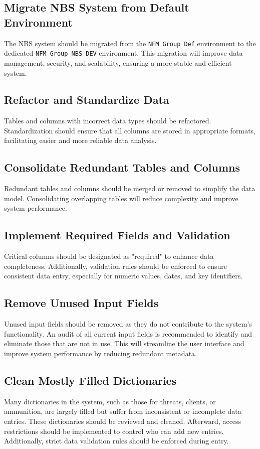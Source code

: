 \subsection{Migrate NBS System from Default Environment}
The NBS system should be migrated from the \texttt{NFM Group Def} environment to the dedicated \texttt{NFM Group NBS DEV} environment. This migration will improve data management, security, and scalability, ensuring a more stable and efficient system.

\subsection{Refactor and Standardize Data}
Tables and columns with incorrect data types should be refactored. Standardization should ensure that all columns are stored in appropriate formats, facilitating easier and more reliable data analysis.

\subsection{Consolidate Redundant Tables and Columns}
Redundant tables and columns should be merged or removed to simplify the data model. Consolidating overlapping tables will reduce complexity and improve system performance.

\subsection{Implement Required Fields and Validation}
Critical columns should be designated as "required" to enhance data completeness. Additionally, validation rules should be enforced to ensure consistent data entry, especially for numeric values, dates, and key identifiers.

\subsection{Remove Unused Input Fields}
Unused input fields should be removed as they do not contribute to the system's functionality. An audit of all current input fields is recommended to identify and eliminate those that are not in use. This will streamline the user interface and improve system performance by reducing redundant metadata.

\subsection{Clean Mostly Filled Dictionaries}
Many dictionaries in the system, such as those for threats, clients, or ammunition, are largely filled but suffer from inconsistent or incomplete data entries. These dictionaries should be reviewed and cleaned. Afterward, access restrictions should be implemented to control who can add new entries. Additionally, strict data validation rules should be enforced during entry.

